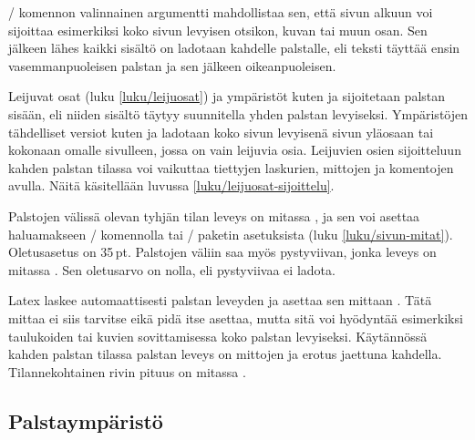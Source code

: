 \begin{koodilohkosis}
\end{koodilohkosis}

\noindent
{}\-/ komennon valinnainen argumentti mahdollistaa sen,
että sivun alkuun voi sijoittaa esimerkiksi koko sivun levyisen otsikon,
kuvan tai muun osan. Sen jälkeen lähes kaikki sisältö on ladotaan
kahdelle palstalle, eli teksti täyttää ensin vasemmanpuoleisen palstan
ja sen jälkeen oikeanpuoleisen.

Leijuvat osat (luku \ref{luku/leijuosat}) ja ympäristöt kuten
 ja  sijoitetaan palstan sisään, eli
niiden sisältö täytyy suunnitella yhden palstan levyiseksi. Ympäristöjen
tähdelliset versiot kuten  ja 
ladotaan koko sivun levyisenä sivun yläosaan tai kokonaan omalle
sivulleen, jossa on vain leijuvia osia. Leijuvien osien sijoitteluun
kahden palstan tilassa voi vaikuttaa tiettyjen laskurien, mittojen ja
komentojen avulla. Näitä käsitellään luvussa
\ref{luku/leijuosat-sijoittelu}.

Palstojen välissä olevan tyhjän tilan leveys on mitassa
, ja sen voi asettaa haluamakseen
\-/ komennolla tai \-/ paketin
asetuksista (luku \ref{luku/sivun-mitat}). Oletusasetus on 35\,pt.
Palstojen väliin saa myös pystyviivan, jonka leveys on mitassa
. Sen oletusarvo on nolla, eli pystyviivaa ei
ladota.

\begin{koodilohkosis}
\setlength{\columnsep}{6mm}       %
\setlength{\columnseprule}{.2mm}  %
\end{koodilohkosis}

\noindent
Latex laskee automaattisesti palstan leveyden ja asettaa sen mittaan
. Tätä mittaa ei siis tarvitse eikä pidä itse
asettaa, mutta sitä voi hyödyntää esimerkiksi taulukoiden tai kuvien
sovittamisessa koko palstan levyiseksi. Käytännössä kahden palstan
tilassa palstan leveys on mittojen  ja
 erotus jaettuna kahdella. Tilannekohtainen rivin
pituus on mitassa .

\subsection{Palstaympäristö}
\label{luku/multicol}

